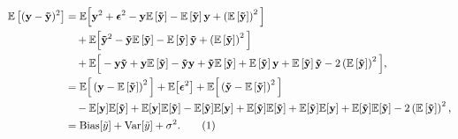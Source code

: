\documentclass[aps,pra,english,notitlepage,reprint,nofootinbib]{revtex4-1}  %
\newcommand\numberthis{\addtocounter{equation}{1}\tag{\theequation}}
\begin{document}
\begin{align*}
\mathbb{E}\left[(\mathbf{y}-\mathbf{\tilde{y}})^2 \right] 
&= \mathbb{E}\Big[\mathbf{y}^2 + \boldsymbol{\epsilon}^2 - \mathbf{y}\mathbb{E}\left[\mathbf{\tilde{y}}\right] -\mathbb{E}\left[\mathbf{\tilde{y}}\right]\mathbf{y}  + \left(\mathbb{E}\left[\mathbf{\tilde{y}}\right]\right)^2\Big]
\\
&\hspace{10pt} + \mathbb{E}\Big[\mathbf{\tilde{y}}^2 - \mathbf{\tilde{y}}\mathbb{E}\left[\mathbf{\tilde{y}}\right] - \mathbb{E}\left[\mathbf{\tilde{y}}\right]\mathbf{\tilde{y}} + \left(\mathbb{E}\left[\mathbf{\tilde{y}}\right]\right)^2\Big]
\\
&\hspace{10pt} +\mathbb{E}\Big[-\mathbf{y}\mathbf{\tilde{y}} + \mathbf{y}\mathbb{E}\left[\mathbf{\tilde{y}} \right] - \mathbf{\tilde{y}}\mathbf{y} + \mathbf{\tilde{y}}\mathbb{E}\left[\mathbf{\tilde{y}}\right] +\mathbb{E}\left[\mathbf{\tilde{y}}\right]\mathbf{y} + \mathbb{E}\left[\mathbf{\tilde{y}}\right]\mathbf{\tilde{y}} - 2\left(\mathbb{E}\left[\mathbf{\tilde{y}}\right]\right)^2\Big],
\\
&= \mathbb{E}\Big[\left(\mathbf{y} - \mathbb{E}\left[\mathbf{\tilde{y}}\right]\right)^2\Big] + \mathbb{E}\big[\boldsymbol{\epsilon}^2\big] + \mathbb{E}\Big[\left(\mathbf{\tilde{y}} - \mathbb{E}\left[\mathbf{\tilde{y}}\right]\right)^2\Big]
\\
&\hspace{10pt} - \mathbb{E}[\mathbf{y}]\mathbb{E}[\mathbf{\tilde{y}}] + \mathbb{E}[\mathbf{y}]\mathbb{E}[\mathbf{\tilde{y}}] - \mathbb{E}[\mathbf{\tilde{y}}]\mathbb{E}[\mathbf{y}] + \mathbb{E}[\mathbf{\tilde{y}}]\mathbb{E}[\mathbf{\tilde{y}}] + \mathbb{E}[\mathbf{\tilde{y}}]\mathbb{E}[\mathbf{y}] + \mathbb{E}[\mathbf{\tilde{y}}]\mathbb{E}[\mathbf{\tilde{y}}] - 2\left(\mathbb{E}\left[\mathbf{\tilde{y}}\right]\right)^2,
\\
&= \text{Bias}[\tilde{y}] + \text{Var}[\tilde{y}] + \sigma^2. \numberthis \label{appeq:cost OLS}
\end{align*}
\end{document}

